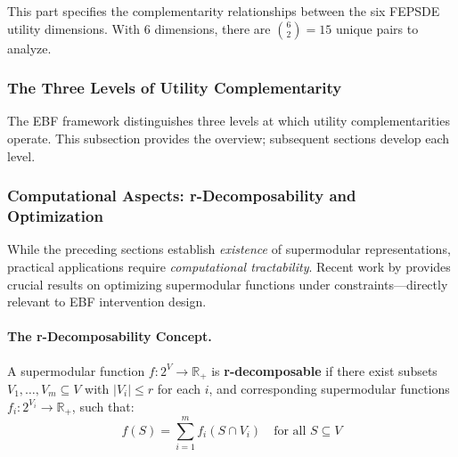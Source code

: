 This part specifies the complementarity relationships between the six FEPSDE 
utility dimensions. With 6 dimensions, there are $\binom{6}{2} = 15$ unique 
pairs to analyze.



\subsubsection{The Three Levels of Utility Complementarity}
\label{sec:three-levels-complementarity}

The EBF framework distinguishes three levels at which utility complementarities 
operate. This subsection provides the overview; subsequent sections develop each level.


\subsubsection{Computational Aspects: r-Decomposability and Optimization}
\label{sec:r-decomposable}

While the preceding sections establish \emph{existence} of supermodular representations, 
practical applications require \emph{computational tractability}. Recent work by 
\citet{chen2025supermodular} provides crucial results on optimizing supermodular 
functions under constraints---directly relevant to EBF intervention design.

\paragraph{The r-Decomposability Concept.}

\begin{definition}[r-Decomposability]
\label{def:r-decomposable}
A supermodular function $f: 2^V \to \mathbb{R}_+$ is \textbf{r-decomposable} if there 
exist subsets $V_1, \ldots, V_m \subseteq V$ with $|V_i| \leq r$ for each $i$, and 
corresponding supermodular functions $f_i: 2^{V_i} \to \mathbb{R}_+$, such that:
\begin{equation}
f(S) = \sum_{i=1}^{m} f_i(S \cap V_i) \quad \text{for all } S \subseteq V
\end{equation}
\end{definition}

